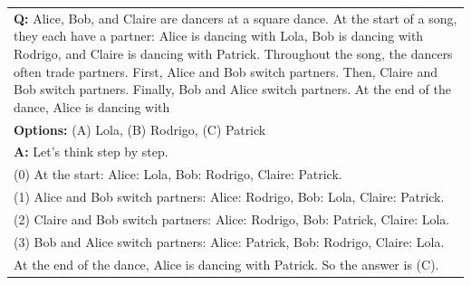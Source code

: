 \begin{table}[H]
\begin{tabularx}{\columnwidth}{@{}X@{}}
        \textbf{Q:} Alice, Bob, and Claire are dancers at a square dance. At the start of a song, they each have a partner: Alice is dancing with Lola, Bob is dancing with Rodrigo, and Claire is dancing with Patrick. Throughout the song, the dancers often trade partners. First, Alice and Bob switch partners. Then, Claire and Bob switch partners. Finally, Bob and Alice switch partners. At the end of the dance, Alice is dancing with \\
        \textbf{Options:} (A) Lola, (B) Rodrigo, (C) Patrick \\
        \textbf{A:} Let's think step by step. \\
        (0) At the start: Alice: Lola, Bob: Rodrigo, Claire: Patrick. \\
        (1) Alice and Bob switch partners: Alice: Rodrigo, Bob: Lola, Claire: Patrick. \\
        (2) Claire and Bob switch partners: Alice: Rodrigo, Bob: Patrick, Claire: Lola. \\
        (3) Bob and Alice switch partners: Alice: Patrick, Bob: Rodrigo, Claire: Lola. \\
        At the end of the dance, Alice is dancing with Patrick. So the answer is (C). \\
        \bottomrule
    \end{tabularx}
\end{table}

